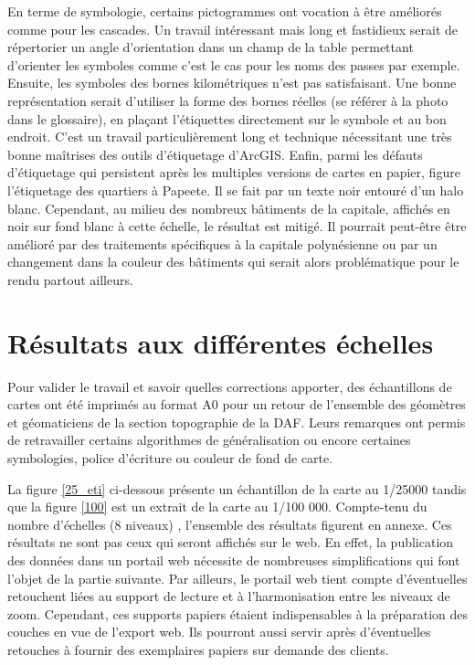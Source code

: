 En terme de symbologie, certains pictogrammes ont vocation à être améliorés comme pour les cascades. Un travail intéressant mais long et fastidieux serait de répertorier un angle d'orientation dans un champ de la table permettant d'orienter les symboles comme c'est le cas pour les noms des passes par exemple. Ensuite, les symboles des bornes kilométriques n'est pas satisfaisant. Une bonne représentation serait d'utiliser la forme des bornes réelles (se référer à la photo dans le glossaire), en plaçant l'étiquettes directement sur le symbole et au bon endroit. C'est un travail particulièrement long et technique nécessitant une très bonne maîtrises des outils d'étiquetage d'ArcGIS. Enfin, parmi les défauts d'étiquetage qui persistent après les multiples versions de cartes en papier, figure l'étiquetage des quartiers à Papeete. Il se fait par un texte noir entouré d'un halo blanc. Cependant, au milieu des nombreux bâtiments de la capitale, affichés en noir sur fond blanc à cette échelle, le résultat est mitigé. Il pourrait peut-être être amélioré par des traitements spécifiques à la capitale polynésienne ou par un changement dans la couleur des bâtiments qui serait alors problématique pour le rendu partout ailleurs.



\section {Résultats aux différentes échelles}

Pour valider le travail et savoir quelles corrections apporter, des échantillons de cartes ont été imprimés au format A0 pour un retour de l'ensemble des géomètres et géomaticiens de la section topographie de la DAF. Leurs remarques ont permis de retravailler certains algorithmes de généralisation ou encore certaines symbologies, police d'écriture ou couleur de fond de carte. 

La figure \ref{25_eti} ci-dessous présente un échantillon de  la carte au 1/25000 tandis que la figure \ref{100} est un extrait de la carte au 1/100 000. Compte-tenu du nombre d'échelles (8 niveaux) , l'ensemble des résultats figurent en annexe. Ces résultats ne sont pas ceux qui seront affichés sur le web. En effet, la publication des données dans un portail web nécessite de nombreuses simplifications qui font l'objet de la partie suivante. Par ailleurs, le portail web tient compte d'éventuelles retouchent liées au support de lecture et à l'harmonisation entre les niveaux de zoom. 
Cependant, ces supports papiers étaient indispensables à la préparation des couches en vue de l'export web. Ils pourront aussi servir après d'éventuelles retouches à fournir des exemplaires papiers sur demande des clients.

